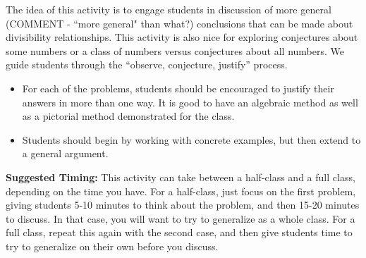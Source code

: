 \documentclass{ximera}
\begin{document}
\newpage
\begin{instructorNotes}
The idea of this activity is to engage students in discussion of more general (COMMENT - ``more general" than what?) conclusions that can be made about divisibility relationships.  This activity is also nice for exploring conjectures about some numbers or a class of numbers versus conjectures about all numbers.  We guide students through the ``observe, conjecture, justify'' process.

\begin{itemize}
    \item For each of the problems, students should be encouraged to justify their answers in more than one way.  It is good to have an algebraic method as well as a pictorial method demonstrated for the class.
    \item Students should begin by working with concrete examples, but then extend to a general argument.
\end{itemize}

{\bf Suggested Timing:} This activity can take between a half-class and a full class, depending on the time you have.  For a half-class, just focus on the first problem, giving students 5-10 minutes to think about the problem, and then 15-20 minutes to discuss.  In that case, you will want to try to generalize as a whole class.  For a full class, repeat this again with the second case, and then give students time to try to generalize on their own before you discuss.

\end{instructorNotes}

 
\end{document}
